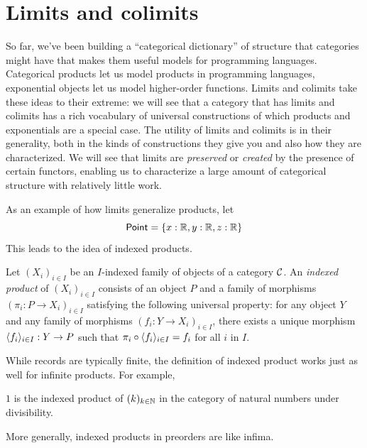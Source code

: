 \chapter{Limits and colimits}
So far, we've been building a ``categorical dictionary'' of structure that
categories might have that makes them useful models for programming languages.
Categorical products let us model products in programming languages, exponential
objects let us model higher-order functions. Limits and colimits take these
ideas to their extreme: we will see that a category that has limits and colimits
has a rich vocabulary of universal constructions of which products and
exponentials are a special case. The utility of limits and colimits is in their 
generality, both in the kinds of constructions they give you and also how they
are characterized. We will see that limits are \emph{preserved} or
\emph{created} by the presence of certain functors, enabling us to characterize
a large amount of categorical structure with relatively little work. 

As an example of how limits generalize products, let
\[
\mathsf{Point} = \{
x: \mathbb R, y: \mathbb R, z: \mathbb R
\}
\]
This leads to the idea of indexed products.
\begin{definition}
  \sloppy
  Let \((X_i)_{i\in I}\) be an \(I\)-indexed
  family of objects of a category \(\mathcal C\).
  An \emph{indexed product} of \((X_i)_{i\in I}\)
  consists of an object \(P\)
  and a family of morphisms \((\pi_i : P \to X_i)_{i\in I}\)
  satisfying the following universal property:
  for any object \(Y\)
  and any family of morphisms \((f_i : Y \to X_i)_{i\in I}\),
  there exists a unique morphism \(\langle f_i\rangle_{i\in I} : Y \to P\)
  such that \(\pi_i \circ \langle f_i\rangle_{i\in I} = f_i\) for all \(i\) in \(I\).
\end{definition}
While records are typically finite, the definition of indexed product
works just as well for infinite products.
For example,
\begin{proposition}
  \(1\) is the indexed product of \((k)_{k\in \mathbb N}\)
  in the category of natural numbers under divisibility.
\end{proposition}
More generally, indexed products in preorders are like infima.

